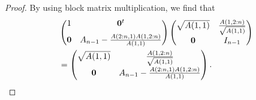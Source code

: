 \begin{proof}
By using block matrix multiplication, we find that
\begin{align*}
&\begin{pmatrix} 1 & \mathbf{0}^t \\[0.6em]
\mathbf{0} & A_{n-1} - \frac{A(2:n,1)A(1,2:n)}{A(1,1)} \end{pmatrix}
\begin{pmatrix} \sqrt{A(1,1)} & \frac{A(1,2:n)}{\sqrt{A(1,1)}} \\[0.6em]
\mathbf{0} & I_{n-1} \end{pmatrix} \\
&= \begin{pmatrix} \sqrt{A(1,1)} & \frac{A(1,2:n)}{\sqrt{A(1,1)}} \\[0.6em]
\mathbf{0} & A_{n-1} - \frac{A(2:n,1)A(1,2:n)}{A(1,1)} \end{pmatrix}.
\end{align*}


\end{proof}
